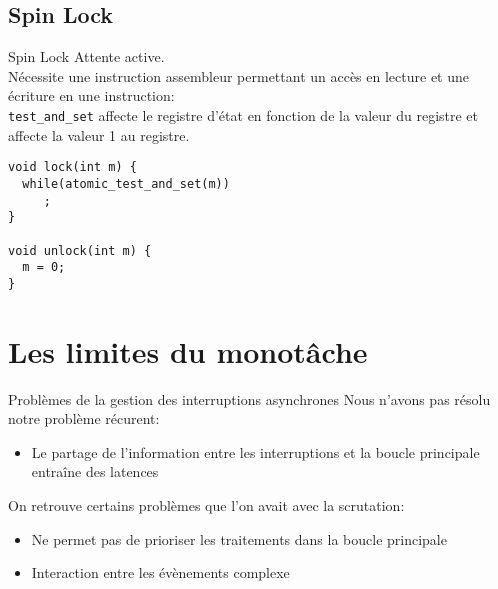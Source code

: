 \subsection{Spin Lock}

\begin{frame}[fragile]{Spin Lock}
  Attente active.\\
  Nécessite une instruction assembleur  permettant un accès en lecture
  et une écriture  en une instruction: \\
  \texttt{test\_and\_set} affecte le registre d'état en fonction de la
  valeur  du registre  et affecte  la valeur  1 au  registre.
  \begin{lstlisting}
void lock(int m) {
  while(atomic_test_and_set(m))
     ;
}

void unlock(int m) {
  m = 0;
}
  \end{lstlisting}
\end{frame}

\section{Les limites du monotâche}

\begin{frame}{Problèmes de la gestion des interruptions asynchrones}
  Nous n'avons pas résolu notre problème récurent:
  \begin{itemize}
  \item  Le partage  de l'information  entre les  interruptions  et la
    boucle principale entraîne des latences
  \end{itemize}
  On retrouve certains problèmes que l'on avait avec la scrutation:
  \begin{itemize}
  \item  Ne permet  pas de  prioriser  les traitements  dans la  boucle
    principale
  \item Interaction entre les évènements complexe
  \end{itemize}
\end{frame}


